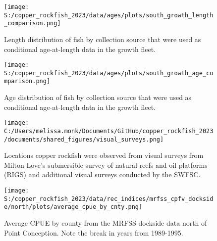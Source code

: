 \documentclass[11pt,
  letterpaper,
]{article}
\begin{document}
\pagebreak

\begin{figure}
{\centering
\texttt{[image: S:/copper\_rockfish\_2023/data/ages/plots/south\_growth\_length\_comparison.png]}
}
\caption{Length distribution of fish by collection source that were used as conditional age-at-length data in the growth fleet.\label{fig:growth-len-dist}}
\end{figure}

\pagebreak

\begin{figure}
{\centering
\texttt{[image: S:/copper\_rockfish\_2023/data/ages/plots/south\_growth\_age\_comparison.png]}
}
\caption{Age distribution of fish by collection source that were used as conditional age-at-length data in the growth fleet.\label{fig:growth-age-dist}}
\end{figure}

\pagebreak

\begin{figure}
{\centering
\texttt{[image: C:/Users/melissa.monk/Documents/GitHub/copper\_rockfish\_2023/documents/shared\_figures/visual\_surveys.png]}
}
\caption{Locations copper rockfish were observed from visual surveys from Milton Love's submersible survey of natural reefs and oil platforms (RIGS) and additional visual surveys conducted by the SWFSC.\label{fig:visual-surveys}}
\end{figure}

\begin{figure}
{\centering
\texttt{[image: S:/copper\_rockfish\_2023/data/rec\_indices/mrfss\_cpfv\_dockside/north/plots/average\_cpue\_by\_cnty.png]}
}
\caption{Average CPUE by county from the MRFSS dockside data north of Point Conception. Note the break in years from 1989-1995.\label{fig:mrfss-cpue-county}}
\end{figure}
\end{document}
